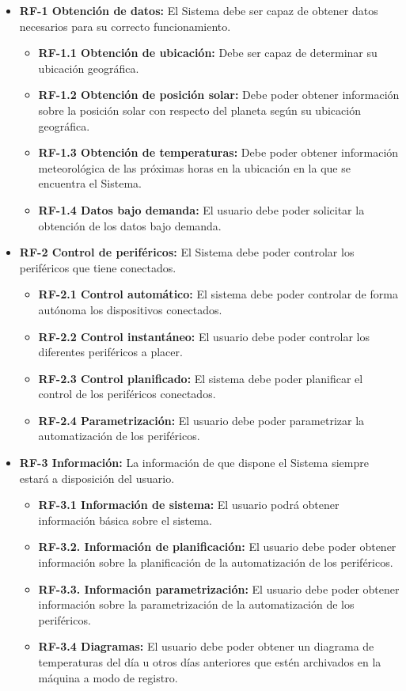 \begin{itemize}
    \item \textbf{RF-1 Obtención de datos:} El Sistema debe ser capaz de obtener datos necesarios para su correcto funcionamiento.
    \begin{itemize}
        \item \textbf{RF-1.1 Obtención de ubicación:} Debe ser capaz de determinar su ubicación geográfica.
        \item \textbf{RF-1.2 Obtención de posición solar:} Debe poder obtener información sobre la posición solar con respecto del planeta según su ubicación geográfica.
        \item \textbf{RF-1.3 Obtención de temperaturas:} Debe poder obtener información meteorológica de las próximas horas en la ubicación en la que se encuentra el Sistema.
        \item \textbf{RF-1.4 Datos bajo demanda:} El usuario debe poder solicitar la obtención de los datos bajo demanda.
    \end{itemize}

    \item \textbf{RF-2 Control de periféricos:} El Sistema debe poder controlar los periféricos que tiene conectados.
    \begin{itemize}
        \item \textbf{RF-2.1 Control automático:} El sistema debe poder controlar de forma autónoma los dispositivos conectados.
        \item \textbf{RF-2.2 Control instantáneo:} El usuario debe poder controlar los diferentes periféricos a placer.
        \item \textbf{RF-2.3 Control planificado:} El sistema debe poder planificar el control de los periféricos conectados.
        \item \textbf{RF-2.4 Parametrización:} El usuario debe poder parametrizar la automatización de los periféricos.
    \end{itemize}
    
    \item \textbf{RF-3 Información:} La información de que dispone el Sistema siempre estará a disposición del usuario.
    \begin{itemize}
        \item \textbf{RF-3.1 Información de sistema:} El usuario podrá obtener información básica sobre el sistema.
        \item \textbf{RF-3.2. Información de planificación:} El usuario debe poder obtener información sobre la planificación de la automatización de los periféricos.
        \item \textbf{RF-3.3. Información parametrización:} El usuario debe poder obtener información sobre la parametrización de la automatización de los periféricos.
        \item \textbf{RF-3.4 Diagramas:} El usuario debe poder obtener un diagrama de temperaturas del día u otros días anteriores que estén archivados en la máquina a modo de registro.
    \end{itemize}
    

\end{itemize}

